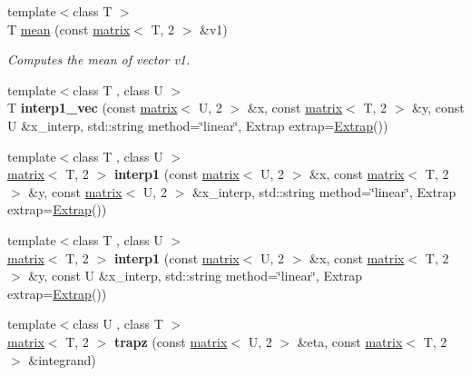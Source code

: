 \begin{DoxyCompactItemize}
\item 
\hypertarget{namespacekeycpp_a24ef7ec1e4c2fab43922859a44758da6}{{\footnotesize template$<$class T $>$ }\\T \hyperlink{namespacekeycpp_a24ef7ec1e4c2fab43922859a44758da6}{mean} (const \hyperlink{classkeycpp_1_1matrix}{matrix}$<$ T, 2 $>$ \&v1)}\label{namespacekeycpp_a24ef7ec1e4c2fab43922859a44758da6}

\begin{DoxyCompactList}\small\item\em Computes the mean of vector v1. \end{DoxyCompactList}\item 
\hypertarget{namespacekeycpp_a9c5f11c2b7a3890a0987b9dd10e31cd4}{{\footnotesize template$<$class T , class U $>$ }\\T {\bfseries interp1\-\_\-vec} (const \hyperlink{classkeycpp_1_1matrix}{matrix}$<$ U, 2 $>$ \&x, const \hyperlink{classkeycpp_1_1matrix}{matrix}$<$ T, 2 $>$ \&y, const U \&x\-\_\-interp, std\-::string method=\char`\"{}linear\char`\"{}, Extrap extrap=\hyperlink{classkeycpp_1_1_extrap}{Extrap}())}\label{namespacekeycpp_a9c5f11c2b7a3890a0987b9dd10e31cd4}

\item 
\hypertarget{namespacekeycpp_ab452328f21ddc3131c2df2b3cbbbed7c}{{\footnotesize template$<$class T , class U $>$ }\\\hyperlink{classkeycpp_1_1matrix}{matrix}$<$ T, 2 $>$ {\bfseries interp1} (const \hyperlink{classkeycpp_1_1matrix}{matrix}$<$ U, 2 $>$ \&x, const \hyperlink{classkeycpp_1_1matrix}{matrix}$<$ T, 2 $>$ \&y, const \hyperlink{classkeycpp_1_1matrix}{matrix}$<$ U, 2 $>$ \&x\-\_\-interp, std\-::string method=\char`\"{}linear\char`\"{}, Extrap extrap=\hyperlink{classkeycpp_1_1_extrap}{Extrap}())}\label{namespacekeycpp_ab452328f21ddc3131c2df2b3cbbbed7c}

\item 
\hypertarget{namespacekeycpp_aa379fd1b7ae981ede575baf357c18302}{{\footnotesize template$<$class T , class U $>$ }\\\hyperlink{classkeycpp_1_1matrix}{matrix}$<$ T, 2 $>$ {\bfseries interp1} (const \hyperlink{classkeycpp_1_1matrix}{matrix}$<$ U, 2 $>$ \&x, const \hyperlink{classkeycpp_1_1matrix}{matrix}$<$ T, 2 $>$ \&y, const U \&x\-\_\-interp, std\-::string method=\char`\"{}linear\char`\"{}, Extrap extrap=\hyperlink{classkeycpp_1_1_extrap}{Extrap}())}\label{namespacekeycpp_aa379fd1b7ae981ede575baf357c18302}

\item 
\hypertarget{namespacekeycpp_ac9e68fc6f023bc2634c3a6f1ddb7e6b8}{{\footnotesize template$<$class U , class T $>$ }\\\hyperlink{classkeycpp_1_1matrix}{matrix}$<$ T, 2 $>$ {\bfseries trapz} (const \hyperlink{classkeycpp_1_1matrix}{matrix}$<$ U, 2 $>$ \&eta, const \hyperlink{classkeycpp_1_1matrix}{matrix}$<$ T, 2 $>$ \&integrand)}\label{namespacekeycpp_ac9e68fc6f023bc2634c3a6f1ddb7e6b8}


\end{DoxyCompactItemize}
